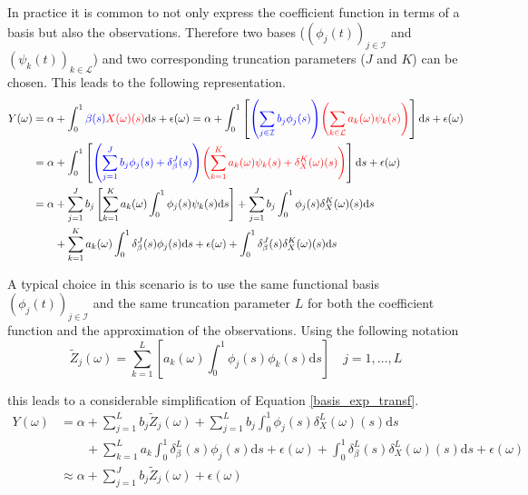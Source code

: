 \documentclass[11pt,twoside,a4paper]{article}
\begin{document}
	In practice it is common to not only express the coefficient function in terms of a basis but also the observations. Therefore two bases ($\left(\phi_j(t)\right)_{j \in \mathcal{I}}$ and $\left(\psi_k(t)\right)_{k \in \mathcal{L}}$) and two corresponding truncation parameters ($J$ and $K$) can be chosen. This leads to the following representation.
	\begin{equation}
		\begin{split}
			Y(\omega) & = \alpha + \int_{0}^{1} {\color{blue}\beta(s)} {\color{red}X(\omega)(s)}\mathrm{d}s + \epsilon(\omega)
			 = \alpha + \int_{0}^{1}\left[{\color{blue}\left(\sum_{j \in \mathcal{I}} b_j  \phi_j(s)\right)} {\color{red}\left(\sum_{k \in \mathcal{L}} a_k(\omega)  \psi_k(s)\right)} \right]\mathrm{d}s + \epsilon(\omega) \\
			& = \alpha + \int_{0}^{1}\left[{\color{blue}\left(\sum_{j = 1}^{J} b_j  \phi_j(s) + \delta_{\beta}^{J}(s)\right)} {\color{red}\left(\sum_{k = 1}^K a_k(\omega)  \psi_k(s) + \delta_{X}^{K}(\omega)(s)\right)} \right]\mathrm{d}s + \epsilon(\omega)\\
			& = \alpha + \sum_{j = 1}^J b_j \left[\sum_{k = 1}^K a_k(\omega) \int_{0}^{1} \phi_j(s) \psi_k(s) \mathrm{d}s\right] + \sum_{j = 1}^{J} b_j  \int_{0}^{1} \phi_j(s) \delta_{X}^{K}(\omega)(s) \mathrm{d}s\\
			& \quad \quad + \sum_{k = 1}^{K} a_k(\omega)  \int_{0}^{1} \delta_{\beta}^{J}(s)\phi_j(s) \mathrm{d}s + \epsilon(\omega) + \int_{0}^{1}  \delta_{\beta}^{J}(s) \delta_{X}^{K}(\omega)(s) \mathrm{d}s
		\end{split}
	\end{equation}

	A typical choice in this scenario is to use the same functional basis $\left(\phi_j(t)\right)_{j \in \mathcal{I}}$ and the same truncation parameter $L$ for both the coefficient function and the approximation of the observations. Using the following notation 
	\begin{equation}
			\tilde{Z}_j(\omega) = \sum_{k = 1}^{L} \left[a_k(\omega) \int_{0}^{1} \phi_j(s) \phi_k(s) \mathrm{d}s \right] \quad j = 1, \dots, L
	\end{equation}

	this leads to a considerable simplification of Equation \ref{basis_exp_transf}.
	\begin{equation}\label{simplified_model_basis_equation}
		\begin{split}
			Y(\omega) &= \alpha + \sum_{j = 1}^{L} b_j \tilde{Z}_j(\omega) + \sum_{j = 1}^{L} b_j  \int_{0}^{1} \phi_j(s) \delta_{X}^{L}(\omega)(s) \mathrm{d}s\\
			& \quad \quad + \sum_{k = 1}^{L} a_k  \int_{0}^{1} \delta_{\beta}^{L}(s)\phi_j(s) \mathrm{d}s + \epsilon(\omega) + \int_{0}^{1}  \delta_{\beta}^{L}(s) \delta_{X}^{L}(\omega)(s) \mathrm{d}s + \epsilon(\omega)\\
			& \approx \alpha + \sum_{j = 1}^{J} b_j \tilde{Z}_j(\omega) + \epsilon(\omega)
		\end{split}
	\end{equation}
\end{document}
